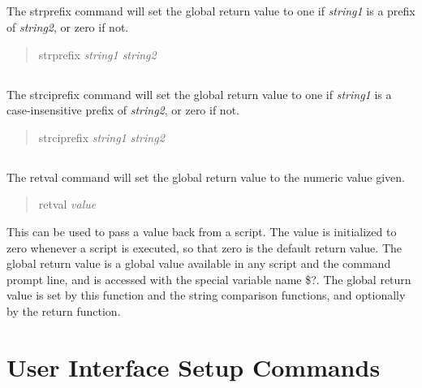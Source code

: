 \subsection{}


The {\cb strprefix} command will set the global return value to one if
{\it string1} is a prefix of {\it string2\/}, or zero if not.
\begin{quote}\vt
strprefix {\it string1 string2}
\end{quote}

\subsection{}


The {\cb strciprefix} command will set the global return value to one
if {\it string1} is a case-insensitive prefix of {\it string2\/}, or
zero if not.
\begin{quote}\vt
strciprefix {\it string1 string2}
\end{quote}

\subsection{}


The {\cb retval} command will set the global return value to the numeric
value given.
\begin{quote}\vt
retval {\it value}
\end{quote}
This can be used to pass a value back from a script.  The value is
initialized to zero whenever a script is executed, so that zero is the
default return value.  The global return value is a global value
available in any script and the command prompt line, and is accessed
with the special variable name {\vt \$?}.  The global return value is
set by this function and the string comparison functions, and
optionally by the {\cb return} function.


\section{User Interface Setup Commands}

